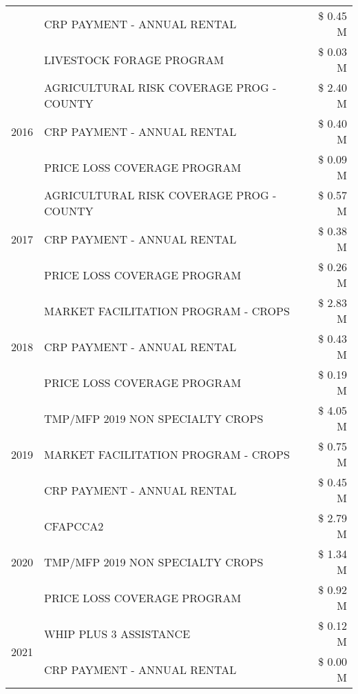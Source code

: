 \begin{tabular}{llr}
 & CRP PAYMENT - ANNUAL RENTAL & \$ 0.45 M \\
 & LIVESTOCK FORAGE PROGRAM & \$ 0.03 M \\
\cline{1-3}
\multirow[t]{3}{*}{2016} & AGRICULTURAL RISK COVERAGE PROG - COUNTY & \$ 2.40 M \\
 & CRP PAYMENT - ANNUAL RENTAL & \$ 0.40 M \\
 & PRICE LOSS COVERAGE PROGRAM & \$ 0.09 M \\
\cline{1-3}
\multirow[t]{3}{*}{2017} & AGRICULTURAL RISK COVERAGE PROG - COUNTY & \$ 0.57 M \\
 & CRP PAYMENT - ANNUAL RENTAL & \$ 0.38 M \\
 & PRICE LOSS COVERAGE PROGRAM & \$ 0.26 M \\
\cline{1-3}
\multirow[t]{3}{*}{2018} & MARKET FACILITATION PROGRAM - CROPS & \$ 2.83 M \\
 & CRP PAYMENT - ANNUAL RENTAL & \$ 0.43 M \\
 & PRICE LOSS COVERAGE PROGRAM & \$ 0.19 M \\
\cline{1-3}
\multirow[t]{3}{*}{2019} & TMP/MFP 2019 NON SPECIALTY CROPS & \$ 4.05 M \\
 & MARKET FACILITATION PROGRAM - CROPS & \$ 0.75 M \\
 & CRP PAYMENT - ANNUAL RENTAL & \$ 0.45 M \\
\cline{1-3}
\multirow[t]{3}{*}{2020} & CFAPCCA2 & \$ 2.79 M \\
 & TMP/MFP 2019 NON SPECIALTY CROPS & \$ 1.34 M \\
 & PRICE LOSS COVERAGE PROGRAM & \$ 0.92 M \\
\cline{1-3}
\multirow[t]{2}{*}{2021} & WHIP PLUS 3 ASSISTANCE & \$ 0.12 M \\
 & CRP PAYMENT - ANNUAL RENTAL & \$ 0.00 M \\
\cline{1-3}
\bottomrule
\end{tabular}
